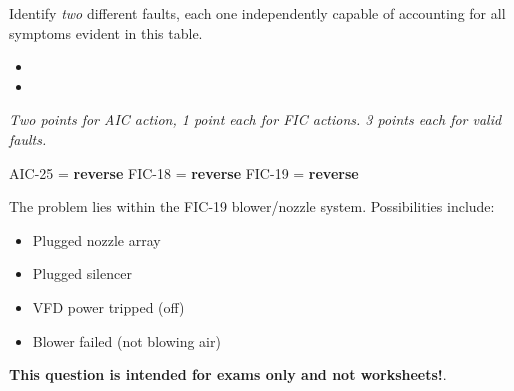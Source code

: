 Identify {\it two} different faults, each one independently capable of accounting for all symptoms evident in this table.

\begin{itemize}
\item{} 
\vskip 50pt
\item{} 
\end{itemize}






{\it Two points for AIC action, 1 point each for FIC actions.  3 points each for valid faults.}

\vskip 10pt

AIC-25 = {\bf reverse} \hskip 50pt FIC-18 = {\bf reverse} \hskip 50pt FIC-19 = {\bf reverse}

\vskip 10pt

The problem lies within the FIC-19 blower/nozzle system.  Possibilities include:

\begin{itemize}
\item{} Plugged nozzle array
\item{} Plugged silencer
\item{} VFD power tripped (off)
\item{} Blower failed (not blowing air)
\end{itemize}







{\bf This question is intended for exams only and not worksheets!}.



